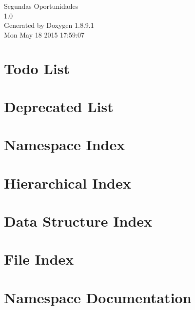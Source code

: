 \documentclass[twoside]{book}
\newcommand{\+}{\discretionary{\mbox{\scriptsize$\hookleftarrow$}}{}{}}
\newcommand{\clearemptydoublepage}{%
  \newpage{\pagestyle{empty}\cleardoublepage}%
}
\begin{document}
\hypersetup{pageanchor=false,
             bookmarks=true,
             bookmarksnumbered=true,
             pdfencoding=unicode
            }
\begin{titlepage}
\vspace*{7cm}
\begin{center}%
{\Large Segundas Oportunidades \\[1ex]\large 1.\+0 }\\
\vspace*{1cm}
{\large Generated by Doxygen 1.8.9.1}\\
\vspace*{0.5cm}
{\small Mon May 18 2015 17:59:07}\\
\end{center}
\end{titlepage}
\clearemptydoublepage
\tableofcontents
\clearemptydoublepage
{}
\hypersetup{pageanchor=true}

\chapter{Todo List}
\label{todo}
\hypertarget{todo}{}

\chapter{Deprecated List}
\label{deprecated}
\hypertarget{deprecated}{}

\chapter{Namespace Index}

\chapter{Hierarchical Index}

\chapter{Data Structure Index}

\chapter{File Index}

\chapter{Namespace Documentation}



\end{document}
